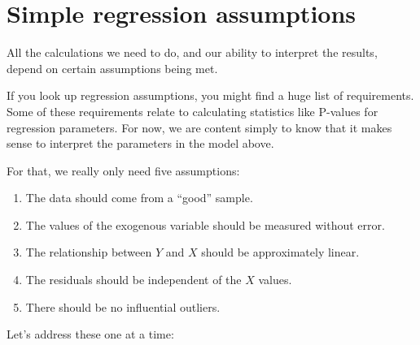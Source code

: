 \documentclass[
]{book}
\providecommand{\tightlist}{%
  \setlength{\itemsep}{0pt}\setlength{\parskip}{0pt}}
\begin{document}
\hypertarget{simple-assumptions}{%
\section{Simple regression assumptions}\label{simple-assumptions}}

All the calculations we need to do, and our ability to interpret the results, depend on certain assumptions being met.

If you look up regression assumptions, you might find a huge list of requirements. Some of these requirements relate to calculating statistics like P-values for regression parameters. For now, we are content simply to know that it makes sense to interpret the parameters in the model above.

For that, we really only need five assumptions:

\begin{enumerate}
\def\labelenumi{\arabic{enumi}.}
\tightlist
\item
  The data should come from a ``good'' sample.
\item
  The values of the exogenous variable should be measured without error.
\item
  The relationship between \(Y\) and \(X\) should be approximately linear.
\item
  The residuals should be independent of the \(X\) values.
\item
  There should be no influential outliers.
\end{enumerate}

Let's address these one at a time:
\end{document}
